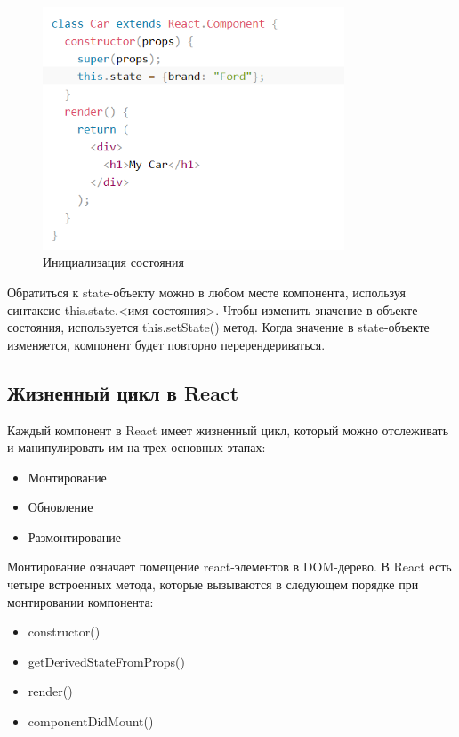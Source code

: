 \documentclass[a4paper,12pt]{diplom}
\begin{document}
\begin{figure}[!ht]
\centering
\includegraphics[width=0.8\textwidth]{resources/state.png}
\caption{Инициализация состояния}
\label{b}
\end{figure}

Обратиться к state-объекту можно в любом месте компонента, используя синтаксис this.state.<имя-состояния>. Чтобы изменить значение в объекте состояния, используется this.setState() метод.
Когда значение в state-объекте изменяется, компонент будет повторно перерендериваться.

\subsection{Жизненный цикл в React}

Каждый компонент в React имеет жизненный цикл, который можно отслеживать и манипулировать им на трех основных этапах:

\begin{itemize}
\item Монтирование
\item Обновление
\item Размонтирование
\end{itemize}

Монтирование означает помещение react-элементов в DOM-дерево. В React есть четыре встроенных метода, которые вызываются в следующем порядке при монтировании компонента:

\begin{itemize}
  \item constructor()
  \item getDerivedStateFromProps()
  \item render()
  \item componentDidMount()
\end{itemize}
\end{document}
